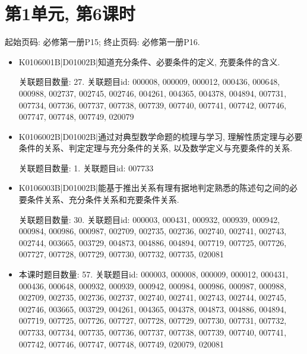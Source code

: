 \section*{第1单元, 第6课时}
起始页码: 必修第一册P15; 终止页码: 必修第一册P16.
\begin{itemize}
\item K0106001B|D01002B|知道充分条件、必要条件的定义, 充要条件的含义.

关联题目数量: 27. 关联题目id: 000008, 000009, 000012, 000436, 000648, 000988, 002737, 002745, 002746, 004261, 004365, 004378, 004894, 007731, 007734, 007736, 007737, 007738, 007739, 007740, 007741, 007742, 007746, 007747, 007748, 007749, 020079

\item K0106002B|D01002B|通过对典型数学命题的梳理与学习, 理解性质定理与必要条件的关系、判定定理与充分条件的关系, 以及数学定义与充要条件的关系.

关联题目数量: 1. 关联题目id: 007733

\item K0106003B|D01002B|能基于推出关系有理有据地判定熟悉的陈述句之间的必要条件关系、充分条件关系和充要条件关系.

关联题目数量: 30. 关联题目id: 000003, 000431, 000932, 000939, 000942, 000984, 000986, 000987, 002709, 002735, 002736, 002740, 002741, 002743, 002744, 003665, 003729, 004873, 004886, 004894, 007719, 007725, 007726, 007727, 007728, 007729, 007730, 007732, 007735, 020081

\item 本课时题目数量: 57. 关联题目id: 000003, 000008, 000009, 000012, 000431, 000436, 000648, 000932, 000939, 000942, 000984, 000986, 000987, 000988, 002709, 002735, 002736, 002737, 002740, 002741, 002743, 002744, 002745, 002746, 003665, 003729, 004261, 004365, 004378, 004873, 004886, 004894, 007719, 007725, 007726, 007727, 007728, 007729, 007730, 007731, 007732, 007733, 007734, 007735, 007736, 007737, 007738, 007739, 007740, 007741, 007742, 007746, 007747, 007748, 007749, 020079, 020081

\end{itemize}


